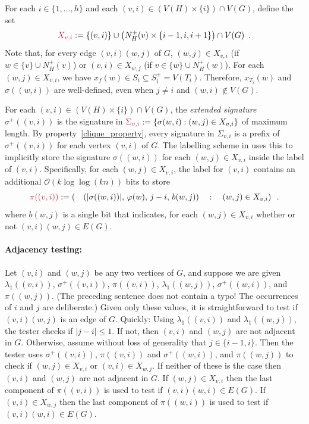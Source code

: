 \documentclass{patmorin}
\makeatletter
\renewcommand{\le}{\leqslant}
\newcommand{\defin}[1]{\emph{\textcolor{brightmaroon}{#1}}}
\def\mathcolor#1#{\@mathcolor{#1}}
\def\@mathcolor#1#2#3{%
  \protect\leavevmode
  \begingroup
    \color#1{#2}#3%
  \endgroup
}
\newcommand{\mathdefin}[1]{\mathcolor{brightmaroon}{#1}}
\newcommand{\Oh}{\mathcal{O}}
\makeatother
\begin{document}
  For each $i\in\{1,\ldots,h\}$ and each $(v,i)\in (V(H)\times\{i\})\cap V(G)$, define the set
  \[
     \mathdefin{X_{v,i}}:= \{(v,i)\}\cup \left(N_H^+(v)\times\{i-1,i,i+1\}\right)\cap V(G) \enspace .
  \]
  Note that, for every edge $(v,i)(w,j)$ of $G$, $(w,j)\in X_{v,i}$ (if $w\in \{v\}\cup N^+_H(v)$) or $(v,i)\in X_{w,j}$ (if $v\in \{w\}\cup N^+_H(w)$).
  For each $(w,j)\in X_{v,i}$, we have $x_f(w)\in S_i\subseteq S^+_i=V(T_i)$. Therefore, $x_{T_i}(w)$ and $\sigma((w,i))$ are well-defined, even when $j\neq i$ and $(w,i)\not\in V(G)$.

  For each $(v,i)\in (V(H)\times\{i\})\cap V(G)$, the \defin{extended signature} \defin{$\sigma^+((v,i))$} is the signature in $\mathdefin{\Sigma_{v,i}}:=\{\sigma(w,i):(w,j)\in X_{v,i}\}$ of maximum length.
  By property~\ref{clique_property}, every signature in $\Sigma_{v,i}$ is a prefix of $\sigma^+((v,i))$ for each vertex $(v,i)$ of $G$.
  The labelling scheme in \cite{dujmovic.esperet.ea:adjacency} uses this to implicitly store the signature $\sigma((w,i))$ for each $(w,j)\in X_{v,i}$ inside the label of $(v,i)$.
  Specifically, for each $(w,j)\in X_{v,i}$, the label for $(v,i)$ contains an additional $\Oh(k\log\log (kn))$ bits to store
  \begin{equation}
     \mathdefin{\pi((v,i))}:= \left( \quad(|\sigma((w,i))|,\, \varphi(w),\, j-i,\, b(w,j))\quad :\quad (w,j)\in X_{v,i}\right) \enspace .
     \label{four_tuple}
  \end{equation}
  where $b(w,j)$ is a single bit that indicates, for each $(w,j)\in X_{v,i}$ whether or not $(v,i)(w,j)\in E(G)$.

  \paragraph{Adjacency testing:}
  Let $(v,i)$ and $(w,j)$ be any two vertices of $G$, and suppose we are given $\lambda_1((v,i))$, $\sigma^+((v,i))$, $\pi((v,i))$, $\lambda_1((w,j))$, $\sigma^+((w,i))$, and $\pi((w,j))$.
  (The preceding sentence does not contain a typo! The occurrences of $i$ and $j$ are deliberate.) Given only these values, it is straightforward to test if $(v,i)(w,j)$ is an edge of $G$.
  Quickly: Using $\lambda_1((v,i))$ and $\lambda_1((w,j))$, the tester checks if $|j-i|\le 1$.
  If not, then $(v,i)$ and $(w,j)$ are not adjacent in $G$.  Otherwise, assume without loss of generality that $j\in\{i-1, i\}$.
  Then the tester uses $\sigma^+((v,i))$, $\pi((v,i))$ and $\sigma^+((w,i))$, and $\pi((w,j))$ to check if $(w,j)\in X_{v,i}$ or $(v,i)\in X_{w,j}$.
  If neither of these is the case then $(v,i)$ and $(w,j)$ are not adjacent in $G$.
  If $(w,j)\in X_{v,i}$ then the last component of $\pi((v,i))$ is used to test if $(v,i)(w,i)\in E(G)$.
  If $(v,i)\in X_{w,j}$ then the last component of $\pi((w,i))$ is used to test if $(v,i)(w,i)\in E(G)$.
\end{document}
